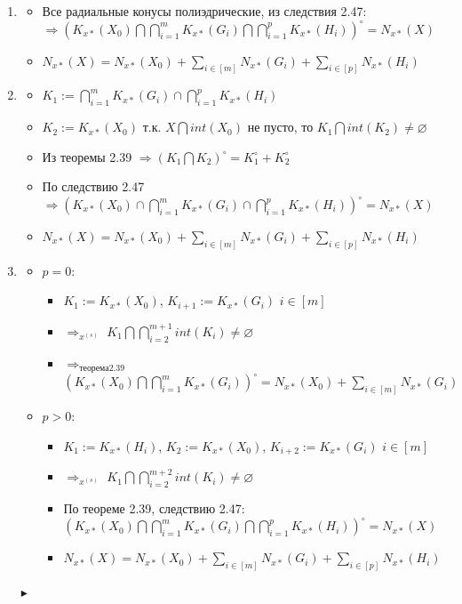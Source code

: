\begin{enumerate}
\item
\begin{itemize}
    \item Все радиальные конусы полиэдрические, из следствия 2.47:\\
    $\Rightarrow (K_{x*}(X_{0})\bigcap\bigcap_{i=1}^{m} K_{x*}(G_{i})\bigcap\bigcap_{i=1}^{p} K_{x*}(H_{i}))^{\circ} = N_{x*}(X)$
     \item $N_{x*}(X) = N_{x*}(X_{0}) + \sum_{i\in[m]}{N_{x*}(G_{i})} + \sum_{i\in[p]}{N_{x*}(H_{i})}$
\end{itemize}
\item
    \begin{itemize}
    \item $K_{1} := \bigcap_{i=1}^{m} K_{x*}(G_{i})\cap\bigcap_{i=1}^{p} K_{x*}(H_{i})$
    \item $K_{2} := K_{x*}(X_{0})$ т.к. $X \bigcap int(X_{0})$ не пусто, то $K_{1} \bigcap int(K_{2}) \neq \varnothing$
    \item Из теоремы 2.39 $\Rightarrow (K_{1} \bigcap K_{2})^{\circ} = K_{1}^{\circ} + K_{2}^{\circ}$
    \item По следствию 2.47 $\Rightarrow (K_{x*}(X_{0})\cap\bigcap_{i=1}^{m} K_{x*}(G_{i})\cap\bigcap_{i=1}^{p} K_{x*}(H_{i}))^{\circ} = N_{x*}(X)$
    \item $N_{x*}(X) = N_{x*}(X_{0}) + \sum_{i\in[m]}{N_{x*}(G_{i})} + \sum_{i\in[p]}{N_{x*}(H_{i})}$
    \end{itemize}
    \item
    \begin{itemize}
    \item $p=0$:
    	\begin{itemize}
    \item $K_{1} := K_{x*}(X_{0})$, $K_{i+1} := K_{x*}(G_{i})$ $i\in[m]$
    \item $\Rightarrow_{x^{(s)}}$ $K_{1}\bigcap\bigcap_{i=2}^{m+1}int(K_{i})\neq\varnothing$
    \item $\Rightarrow_{теорема 2.39}$ $(K_{x*}(X_{0})\bigcap\bigcap_{i=1}^{m}K_{x*}(G_{i}))^{\circ} = N_{x*}(X_{0}) + 			\sum_{i\in[m]}{N_{x*}(G_{i})}$
		\end{itemize}
	\item $p>0$:
		\begin{itemize}
			\item $K_{1} := K_{x*}(H_{i})$, $K_{2} := K_{x*}(X_{0})$, $K_{i+2} := K_{x*}(G_{i})$ $i\in[m]$
		\item $\Rightarrow_{x^{(s)}}$ $K_{1}\bigcap\bigcap_{i=2}^{m+2}int(K_{i})\neq\varnothing$
		\item По теореме 2.39, следствию 2.47:\\
		$(K_{x*}(X_{0})\bigcap\bigcap_{i=1}^{m} K_{x*}(G_{i})\bigcap\bigcap_{i=1}^{p} K_{x*}(H_{i}))^{\circ} = N_{x*}(X)$
		\item $N_{x*}(X) = N_{x*}(X_{0}) + \sum_{i\in[m]}{N_{x*}(G_{i})} + \sum_{i\in[p]}{N_{x*}(H_{i})}$
		\end{itemize}
    \end{itemize}
	 $\blacktriangleright$
\end{enumerate}
